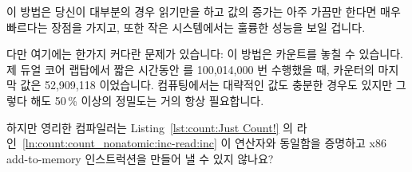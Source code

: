 이 방법은 당신이 대부분의 경우 읽기만을 하고 값의 증가는 아주 가끔만 한다면
매우 빠르다는 장점을 가지고, 또한 작은 시스템에서는 훌륭한 성능을 보일 겁니다.

다만 여기에는 한가지 커다란 문제가 있습니다: 이 방법은 카운트를 놓칠 수
있습니다.
제 듀얼 코어 랩탑에서 짧은 시간동안  를 100,014,000 번 수행했을
때, 카운터의 마지막 값은 52,909,118 이었습니다.
컴퓨팅에서는 대략적인 값도 충분한 경우도 있지만 그렇다 해도 50\,\% 이상의
정밀도는 거의 항상 필요합니다.

\QuickQuiz{}
	하지만 영리한 컴파일러는
	Listing~\ref{lst:count:Just Count!} 의
	라인~\ref{ln:count:count_nonatomic:inc-read:inc} 이 \co{++} 연산자와
	동일함을 증명하고 x86 add-to-memory 인스트럭션을 만들어 낼 수 있지
	않나요?
	\iffalse

